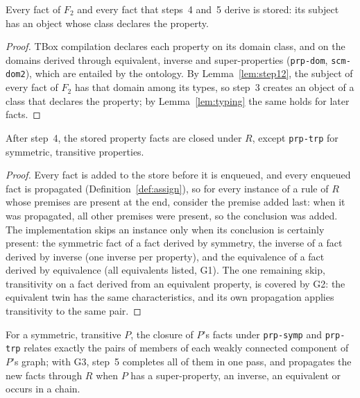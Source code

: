 \begin{lemma}[Storage]
\label{lem:storage}
Every fact of $F_2$ and every fact that steps~4 and~5 derive is stored: its subject has an object
whose class declares the property.
\end{lemma}

\begin{proof}
TBox compilation declares each property on its domain class, and on the domains derived through
equivalent, inverse and super-properties (\texttt{prp-dom}, \texttt{scm-dom2}), which are entailed
by the ontology. By Lemma~\ref{lem:step12}, the subject of every fact of $F_2$ has that domain
among its types, so step~3 creates an object of a class that declares the property; by
Lemma~\ref{lem:typing} the same holds for later facts.
\end{proof}

\begin{lemma}[Step 4]
\label{lem:step4}
After step~4, the stored property facts are closed under $R$, except \texttt{prp-trp} for
symmetric, transitive properties.
\end{lemma}

\begin{proof}
Every fact is added to the store before it is enqueued, and every enqueued fact is propagated
(Definition~\ref{def:assign}), so for every instance of a rule of $R$ whose premises are present
at the end, consider the premise added last: when it was propagated, all other premises were
present, so the conclusion was added. The implementation skips an instance only when its
conclusion is certainly present: the symmetric fact of a fact derived by symmetry, the inverse
of a fact derived by inverse (one inverse per property), and the equivalence of a fact derived by
equivalence (all equivalents listed, G1). The one remaining skip, transitivity on a fact derived
from an equivalent property, is covered by G2: the equivalent twin has the same characteristics,
and its own propagation applies transitivity to the same pair.
\end{proof}

\begin{lemma}[Step 5]
\label{lem:step5}
For a symmetric, transitive $P$, the closure of $P$'s facts under \texttt{prp-symp} and
\texttt{prp-trp} relates exactly the pairs of members of each weakly connected component of $P$'s
graph; with G3, step~5 completes all of them in one pass, and propagates the new facts through
$R$ when $P$ has a super-property, an inverse, an equivalent or occurs in a chain.
\end{lemma}

